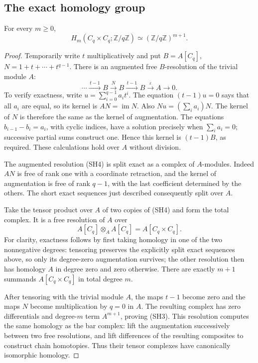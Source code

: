 \subsection{The exact homology group}

\begin{proposition}\label{sh-cyclic-square}
For every \(m\ge0\),
\[
       H_m(C_q\times C_q;\mathbb Z/q\mathbb Z)
                    \simeq(\mathbb Z/q\mathbb Z)^{m+1}.
 \tag{SH3}
\]
\end{proposition}
\begin{proof}
Temporarily write \(t\) multiplicatively and put
\(B=A[C_q]\), \(N=1+t+\cdots+t^{q-1}\).
There is an augmented free \(B\)-resolution of the
trivial module \(A\):
\[
 \cdots\xrightarrow{\,t-1\,}B
       \xrightarrow{\,N\,}B
       \xrightarrow{\,t-1\,}B
       \xrightarrow{\,\varepsilon\,}A\longrightarrow0.
 \tag{SH4}
\]
To verify exactness, write \(u=\sum_{i=0}^{q-1}a_it^i\).
The equation \((t-1)u=0\) says that all \(a_i\) are
equal, so its kernel is \(AN=\operatorname{im}N\).
Also \(Nu=(\sum_i a_i)N\).
The kernel of \(N\) is therefore the same as the kernel
of augmentation.  The equations
\(b_{i-1}-b_i=a_i\), with cyclic indices, have a solution
precisely when \(\sum_i a_i=0\); successive partial
sums construct one.  Hence this kernel is
\((t-1)B\), as required.
These calculations hold over \(A\) without division.

The augmented resolution (SH4) is split exact as a
complex of \(A\)-modules.  Indeed \(AN\) is free of
rank one with a coordinate retraction, and the kernel
of augmentation is free of rank \(q-1\), with the
last coefficient determined by the others.
The short exact sequences just described consequently
split over \(A\).

Take the tensor product over \(A\) of two copies of
(SH4) and form the total complex.
It is a free resolution of \(A\) over
\[
           A[C_q]\otimes_A A[C_q]
                        =A[C_q\times C_q].
\]
For clarity, exactness follows by first taking homology
in one of the two nonnegative degrees: tensoring
preserves the explicitly split exact sequences above,
so only its degree-zero augmentation survives; the
other resolution then has homology \(A\) in degree
zero and zero otherwise.
There are exactly \(m+1\) summands
\(A[C_q\times C_q]\) in total degree \(m\).

After tensoring with the trivial module \(A\),
the maps \(t-1\) become zero and the maps \(N\)
become multiplication by \(q=0\) in \(A\).
The resulting complex has zero differentials and
degree-\(m\) term \(A^{m+1}\), proving (SH3).
This resolution computes the same homology as the
bar complex: lift the augmentation successively
between two free resolutions, and lift differences
of the resulting composites to construct chain
homotopies.  Thus their tensor complexes have
canonically isomorphic homology.
\end{proof}

